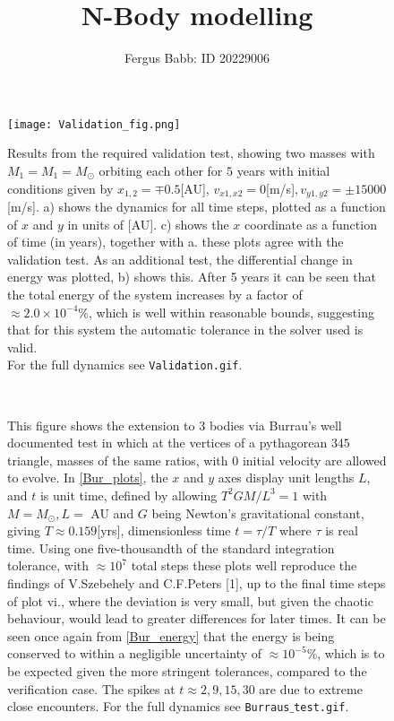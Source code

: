 \documentclass[11pt]{article}
\title{N-Body modelling}
\author{Fergus Babb: ID 20229006}
\date{}
\begin{document}
\maketitle

\begin{figure}[H]
  \centering
	\texttt{[image: Validation\_fig.png]}
\caption{Results from the required validation test, showing two masses with $M_1=M_1=M_\odot$ orbiting each other for $5$ years with initial conditions given by $x_{1,2}=\mp 0.5$[AU], $v_{x1,x2} = 0$[m/s]$, v_{y1,y2} = \pm 15000$[m/s]. a) shows the dynamics for all time steps, plotted as a function of $x$ and $y$ in units of [AU]. c) shows the $x$ coordinate as a function of time (in years), together with a. these plots agree with the validation test. As an additional test, the differential change in energy was plotted, b) shows this. After 5 years it can be seen that the total energy of the system increases by a factor of $\approx 2.0\times 10^{-4}\%$, which is well within reasonable bounds, suggesting that for this system the automatic tolerance in the solver used is valid. \\
For the full dynamics see \texttt{Validation.gif}.}
\label{Val_fig}
\end{figure}
\newpage


\begin{figure}[H]
\centering
     \\
    \caption{This figure shows the extension to 3 bodies via Burrau's well documented test in which at the vertices of a pythagorean $345$ triangle, masses of the same ratios, with $0$ initial velocity are allowed to evolve. In \ref{Bur_plots}, the $x$ and $y$ axes display unit lengths $L$, and $t$ is unit time, defined by allowing $T^2GM/L^3=1$ with $M=M_\odot, L=$ AU and $G$ being Newton's gravitational constant, giving $T\approx 0.159$[yrs], dimensionless time $t=\tau/T$ where $\tau$ is real time. Using one five-thousandth of the standard integration tolerance, with $\approx 10^7$ total steps these plots well reproduce the findings of V.Szebehely and C.F.Peters [1], up to the final time steps of plot vi., where the deviation is very small, but given the chaotic behaviour, would lead to greater differences for later times. It can be seen once again from \ref{Bur_energy} that the energy is being conserved to within a negligible uncertainty of $\approx 10^{-5}\%$, which is to be expected given the more stringent tolerances, compared to the verification case. The spikes at $t \approx 2, 9, 15, 30$ are due to extreme close encounters. For the full dynamics see \texttt{Burraus$\_$test.gif}.} 
    \label{Bur_tes}
\end{figure}
\newpage
\end{document}
